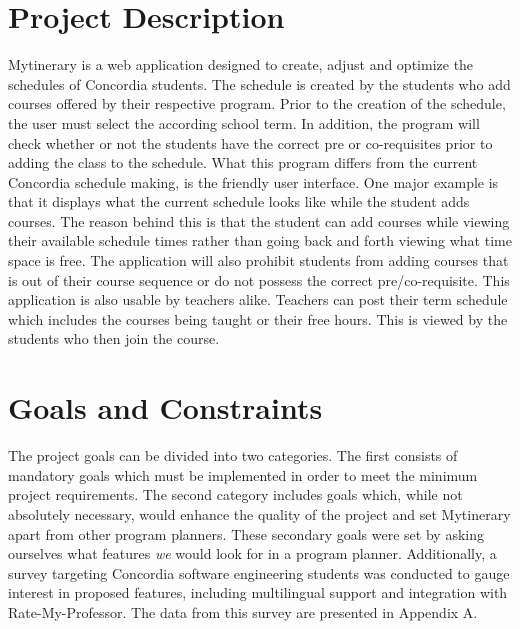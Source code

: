 \documentclass[12pt]{article}
\begin{document}
\section{Project Description}
Mytinerary is a web application designed to create, adjust and optimize the schedules of Concordia students. The schedule is created by the students who add courses offered by their respective program. Prior to the creation of the schedule, the user must select the according school term. In addition, the program will check whether or not the students have the correct pre or co-requisites prior to adding the class to the schedule. What this program differs from the current Concordia schedule making, is the friendly user interface. One major example is that it displays what the current schedule looks like while the student adds courses. The reason behind this is that the student can add courses while viewing their available schedule times rather than going back and forth viewing what time space is free. The application will also prohibit students from adding courses that is out of their course sequence or do not possess the correct pre/co-requisite.
This application is also usable by teachers alike. Teachers can post their term schedule which includes the courses being taught or their free hours. This is viewed by the students who then join the course.

\vfill
\newpage
\section{Goals and Constraints}
The project goals can be divided into two categories. The first consists of
mandatory goals which must be implemented in order to meet the minimum project
requirements. The second category includes goals which, while not absolutely necessary, would
enhance the quality of the project and set Mytinerary apart from other program planners.
These secondary goals were set by asking ourselves what features \emph{we} would look for
in a program planner. Additionally, a survey targeting Concordia software engineering
students was conducted to gauge interest in proposed features, including multilingual
support and integration with Rate-My-Professor. The data from this survey are
presented in Appendix A.
\end{document}
